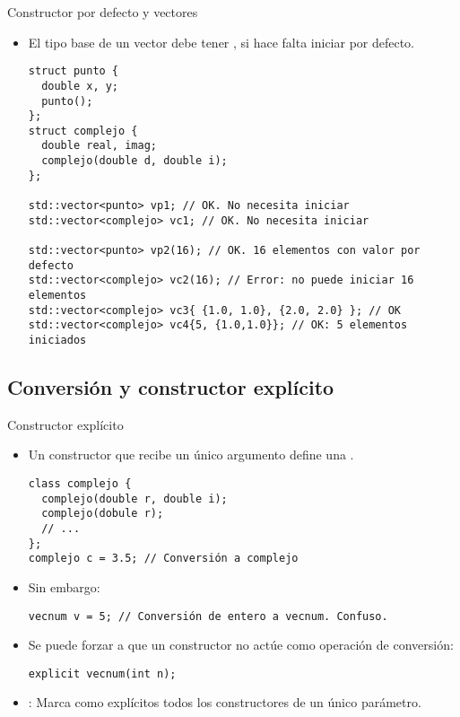 \begin{frame}[t,fragile]{Constructor por defecto y vectores}
\begin{itemize}
  \item El tipo base de un vector debe tener , 
        si hace falta iniciar por defecto.
\begin{lstlisting}
struct punto {
  double x, y;
  punto();
};
struct complejo {
  double real, imag;
  complejo(double d, double i);
};

std::vector<punto> vp1; // OK. No necesita iniciar
std::vector<complejo> vc1; // OK. No necesita iniciar

std::vector<punto> vp2(16); // OK. 16 elementos con valor por defecto
std::vector<complejo> vc2(16); // Error: no puede iniciar 16 elementos
std::vector<complejo> vc3{ {1.0, 1.0}, {2.0, 2.0} }; // OK
std::vector<complejo> vc4{5, {1.0,1.0}}; // OK: 5 elementos iniciados
\end{lstlisting}
\end{itemize}
\end{frame}

\subsection{Conversión y constructor explícito}

\begin{frame}[fragile]{Constructor explícito}
\begin{itemize}
  \item Un constructor que recibe un único argumento define una 
        .
\begin{lstlisting}
class complejo {
  complejo(double r, double i);
  complejo(dobule r);
  // ...
};
complejo c = 3.5; // Conversión a complejo
\end{lstlisting}

  \item Sin embargo:
\begin{lstlisting}
vecnum v = 5; // Conversión de entero a vecnum. Confuso.
\end{lstlisting}

  \item Se puede forzar a que un constructor no actúe como operación de conversión:
\begin{lstlisting}
explicit vecnum(int n);
\end{lstlisting}

  \item {}: Marca como explícitos todos los constructores
        de un único parámetro.
\end{itemize}
\end{frame}

